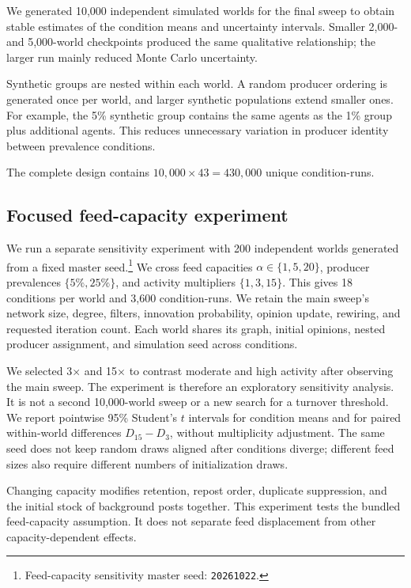 \documentclass[runningheads]{llncs}
\begin{document}
We generated 10,000 independent simulated worlds for the final sweep to obtain stable estimates of the condition means and uncertainty intervals. Smaller 2,000- and 5,000-world checkpoints produced the same qualitative relationship; the larger run mainly reduced Monte Carlo uncertainty.

Synthetic groups are nested within each world. A random producer ordering is generated once per world, and larger synthetic populations extend smaller ones. For example, the 5\% synthetic group contains the same agents as the 1\% group plus additional agents. This reduces unnecessary variation in producer identity between prevalence conditions.

The complete design contains $10{,}000 \times 43 = 430{,}000$ unique condition-runs.

\subsection{Focused feed-capacity experiment}
\label{sec:feed-design}

We run a separate sensitivity experiment with 200 independent worlds generated from a fixed master seed.\footnote{Feed-capacity sensitivity master seed: \texttt{20261022}.} We cross feed capacities \(\alpha\in\{1,5,20\}\), producer prevalences \(\{5\%,25\%\}\), and activity multipliers \(\{1,3,15\}\). This gives 18 conditions per world and 3,600 condition-runs. We retain the main sweep's network size, degree, filters, innovation probability, opinion update, rewiring, and requested iteration count. Each world shares its graph, initial opinions, nested producer assignment, and simulation seed across conditions.

We selected 3\(\times\) and 15\(\times\) to contrast moderate and high activity after observing the main sweep. The experiment is therefore an exploratory sensitivity analysis. It is not a second 10,000-world sweep or a new search for a turnover threshold. We report pointwise 95\% Student's \(t\) intervals for condition means and for paired within-world differences \(D_{15}-D_3\), without multiplicity adjustment. The same seed does not keep random draws aligned after conditions diverge; different feed sizes also require different numbers of initialization draws.

Changing capacity modifies retention, repost order, duplicate suppression, and the initial stock of background posts together. This experiment tests the bundled feed-capacity assumption. It does not separate feed displacement from other capacity-dependent effects.
\end{document}
